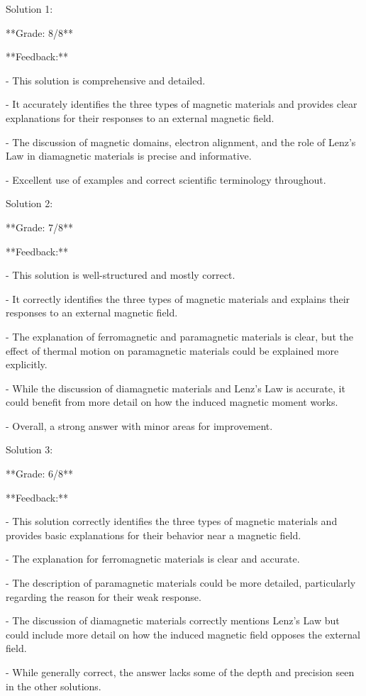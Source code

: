 \documentclass[a4paper,11pt]{article}
\begin{document}
Solution 1:

**Grade: 8/8**

**Feedback:**

- This solution is comprehensive and detailed. 

- It accurately identifies the three types of magnetic materials and provides clear explanations for their responses to an external magnetic field.

- The discussion of magnetic domains, electron alignment, and the role of Lenz's Law in diamagnetic materials is precise and informative.

- Excellent use of examples and correct scientific terminology throughout.

Solution 2:

**Grade: 7/8**

**Feedback:**

- This solution is well-structured and mostly correct.

- It correctly identifies the three types of magnetic materials and explains their responses to an external magnetic field.

- The explanation of ferromagnetic and paramagnetic materials is clear, but the effect of thermal motion on paramagnetic materials could be explained more explicitly.

- While the discussion of diamagnetic materials and Lenz's Law is accurate, it could benefit from more detail on how the induced magnetic moment works.

- Overall, a strong answer with minor areas for improvement.

Solution 3:

**Grade: 6/8**

**Feedback:**

- This solution correctly identifies the three types of magnetic materials and provides basic explanations for their behavior near a magnetic field.

- The explanation for ferromagnetic materials is clear and accurate.

- The description of paramagnetic materials could be more detailed, particularly regarding the reason for their weak response.

- The discussion of diamagnetic materials correctly mentions Lenz's Law but could include more detail on how the induced magnetic field opposes the external field.

- While generally correct, the answer lacks some of the depth and precision seen in the other solutions.
\end{document}
